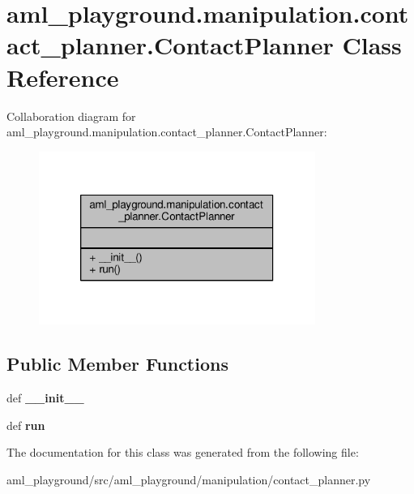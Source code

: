 \hypertarget{classaml__playground_1_1manipulation_1_1contact__planner_1_1_contact_planner}{\section{aml\-\_\-playground.\-manipulation.\-contact\-\_\-planner.\-Contact\-Planner Class Reference}
\label{classaml__playground_1_1manipulation_1_1contact__planner_1_1_contact_planner}
}


Collaboration diagram for aml\-\_\-playground.\-manipulation.\-contact\-\_\-planner.\-Contact\-Planner\-:
\nopagebreak
\begin{figure}[H]
\begin{center}
\leavevmode
\includegraphics[width=256pt]{classaml__playground_1_1manipulation_1_1contact__planner_1_1_contact_planner__coll__graph}
\end{center}
\end{figure}
\subsection*{Public Member Functions}
\begin{DoxyCompactItemize}
\item 
\hypertarget{classaml__playground_1_1manipulation_1_1contact__planner_1_1_contact_planner_afc6c3e5902ab9f0a755ed0947cba5864}{def {\bfseries \-\_\-\-\_\-init\-\_\-\-\_\-}}\label{classaml__playground_1_1manipulation_1_1contact__planner_1_1_contact_planner_afc6c3e5902ab9f0a755ed0947cba5864}

\item 
\hypertarget{classaml__playground_1_1manipulation_1_1contact__planner_1_1_contact_planner_a3cae878db08f9eaffc6100b2271baa88}{def {\bfseries run}}\label{classaml__playground_1_1manipulation_1_1contact__planner_1_1_contact_planner_a3cae878db08f9eaffc6100b2271baa88}

\end{DoxyCompactItemize}


The documentation for this class was generated from the following file\-:\begin{DoxyCompactItemize}
\item 
aml\-\_\-playground/src/aml\-\_\-playground/manipulation/contact\-\_\-planner.\-py\end{DoxyCompactItemize}
